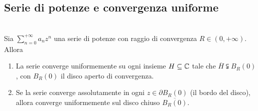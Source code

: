 \subsection{Serie di potenze e convergenza uniforme}
\begin{theorema}~{}\\\label{convergenzasottoinsiemeH}
	Sia $\displaystyle\sum_{n=0}^{+\infty}a_nz^n$ una serie di potenze con raggio di convergenza $R\in\left(0,+\infty\right)$. Allora
	\begin{enumerate}
		\item La serie converge uniformemente su ogni insieme $H\subseteq\mathbb{C}$ tale che $\overline{H}\subsetneqq B_R\left(0\right)$, con $B_R\left(0\right)$ il disco aperto di convergenza.
		\item Se la serie converge assolutamente in ogni $z\in\partial B_R\left(0\right)$ (il bordo del disco), allora converge uniformemente sul disco chiuso $\overline{B_R\left(0\right)}$.
	\end{enumerate}
\end{theorema}
